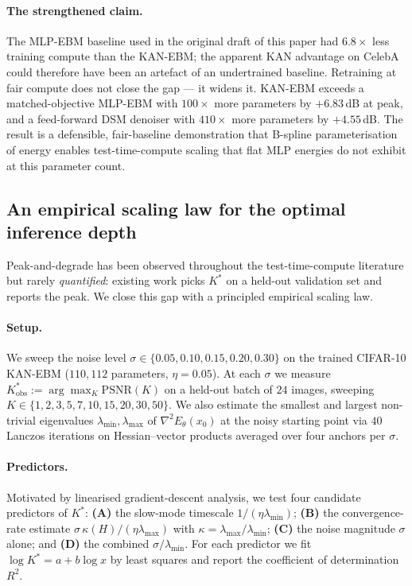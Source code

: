 \documentclass{article}
\begin{document}
\paragraph{The strengthened claim.} The MLP-EBM baseline used in the original
draft of this paper had $6.8\times$ less training compute than the KAN-EBM; the
apparent KAN advantage on CelebA could therefore have been an artefact of an
undertrained baseline. Retraining at fair compute does not close the gap --- it
widens it. KAN-EBM exceeds a matched-objective MLP-EBM with $100\times$ more
parameters by $+6.83$\,dB at peak, and a feed-forward DSM denoiser with
$410\times$ more parameters by $+4.55$\,dB. The result is a defensible,
fair-baseline demonstration that B-spline parameterisation of energy enables
test-time-compute scaling that flat MLP energies do not exhibit at this
parameter count.

\subsection{An empirical scaling law for the optimal inference depth}
\label{sec:kstar}

Peak-and-degrade has been observed throughout the test-time-compute literature
but rarely \emph{quantified}: existing work picks $K^{*}$ on a held-out
validation set and reports the peak. We close this gap with a principled
empirical scaling law.

\paragraph{Setup.} We sweep the noise level $\sigma{\in}\{0.05, 0.10, 0.15, 0.20,
0.30\}$ on the trained CIFAR-10 KAN-EBM ($110{,}112$ parameters,
$\eta{=}0.05$). At each $\sigma$ we measure
$K^{*}_{\text{obs}}{:=}\arg\max_{K}\mathrm{PSNR}(K)$ on a held-out batch of $24$
images, sweeping $K{\in}\{1,2,3,5,7,10,15,20,30,50\}$. We also estimate the
smallest and largest non-trivial eigenvalues $\lambda_{\min}, \lambda_{\max}$ of
$\nabla^{2}E_\theta(x_0)$ at the noisy starting point via $40$ Lanczos
iterations on Hessian--vector products averaged over four anchors per $\sigma$.

\paragraph{Predictors.} Motivated by linearised gradient-descent analysis, we
test four candidate predictors of $K^{*}$:
\textbf{(A)} the slow-mode timescale $1/(\eta\lambda_{\min})$;
\textbf{(B)} the convergence-rate estimate
$\sigma\,\kappa(H)/(\eta\lambda_{\max})$ with
$\kappa{=}\lambda_{\max}/\lambda_{\min}$;
\textbf{(C)} the noise magnitude $\sigma$ alone; and
\textbf{(D)} the combined $\sigma/\lambda_{\min}$.
For each predictor we fit $\log K^{*} = a + b\log x$ by least squares and report
the coefficient of determination $R^{2}$.
\end{document}
